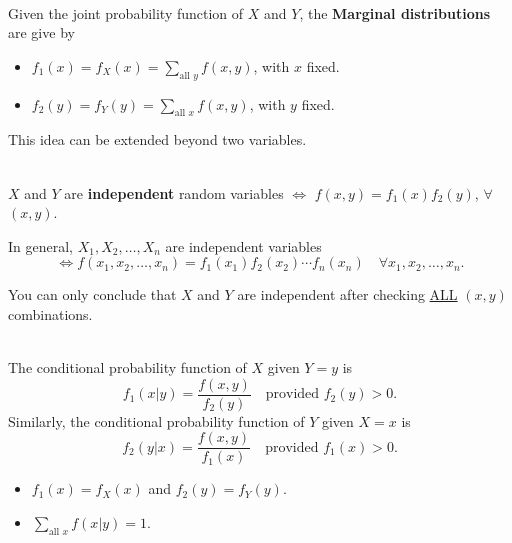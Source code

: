\begin{definition}
    \phantom{}\\
    Given the joint probability function of $X$ and $Y$, the \textbf{Marginal distributions} are give by
    \begin{itemize}
        \item $f_1(x) = f_X(x) = \displaystyle \sum_{\text{all } y} f(x,y)$, with $x$ fixed.
        \item  $f_2(y) = f_Y(y) = \displaystyle \sum_{\text{all } x} f(x,y)$, with $y$ fixed.
    \end{itemize}
\end{definition}

\begin{remark}
    This idea can be extended beyond two variables.
\end{remark}

\begin{definition}
    \phantom{}\\
    $X$ and $Y$ are \textbf{independent} random variables $\iff$ $f(x, y) = f_1(x)f_2(y)$,
    $\forall$ $(x, y)$.
\end{definition}

In general, $X_1, X_2, \ldots, X_n$ are independent variables \vspace{-3mm}
    \[\iff f(x_1, x_2, \ldots, x_n) = f_1(x_1)f_2(x_2) \cdots f_n(x_n) \quad \forall x_1, x_2, \ldots, x_n.\]

\begin{remark}
    You can only conclude that $X$ and $Y$ are independent after checking \underline{ALL} $(x,y)$ combinations.
\end{remark}

\pagebreak

\begin{definition}
    \phantom{}  \\
    The conditional probability function of $X$ given $Y = y$ is
    \[f_1(x|y) = \frac{f(x, y)}{f_2(y)} \quad \text{provided $f_2(y) > 0$}.\]
    Similarly, the conditional probability function of $Y$ given $X = x$ is
    \[f_2(y|x) = \frac{f(x, y)}{f_1(x)} \quad \text{provided $f_1(x) > 0$}.\]
\end{definition}

\begin{note}
    \phantom{}
    \begin{itemize}
        \item $f_1(x) = f_X(x)$ and $f_2(y) = f_Y(y)$.
        \item $\displaystyle \sum_{\text{all } x} f(x|y) = 1$.
    \end{itemize}
\end{note}

